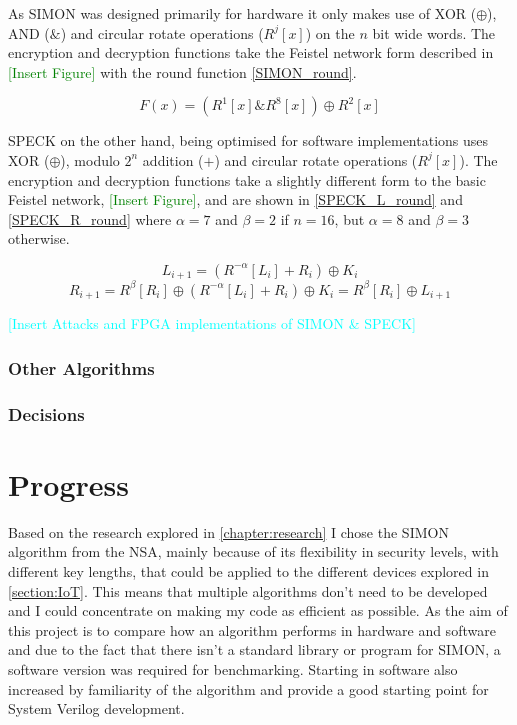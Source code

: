 \documentclass[12pt,twoside,a4paper]{report}
\begin{document}
    As SIMON was designed primarily for hardware it only makes use of XOR ($\oplus$), AND ($\&$) and circular rotate operations ($R^j[x]$) on the $n$ bit wide words.
    The encryption and decryption functions take the Feistel network form described in \textcolor{green}{[Insert Figure]} with the round function \autoref{SIMON_round}.
    
    \begin{equation}
    \label{SIMON_round}
    F(x) = (R^1[x]\&R^8[x]) \oplus R^2[x]
    \end{equation}
    
    SPECK on the other hand, being optimised for software implementations uses XOR ($\oplus$), modulo $2^n$ addition ($+$) and circular rotate operations ($R^j[x]$).
    The encryption and decryption functions take a slightly different form to the basic Feistel network, \textcolor{green}{[Insert Figure]}, and are shown in \autoref{SPECK_L_round} and \ref{SPECK_R_round} where $\alpha = 7$ and $\beta = 2$ if $n = 16$, but $\alpha = 8$ and $\beta = 3$ otherwise.
    
    \begin{equation}
    \label{SPECK_L_round}
    L_{i+1} = (R^{-\alpha}[L_i] + R_i) \oplus K_i
    \end{equation}
    \begin{equation}
    \label{SPECK_R_round}
    R_{i+1} = R^{\beta}[R_i] \oplus (R^{-\alpha}[L_i] + R_i) \oplus K_i = R^{\beta}[R_i] \oplus L_{i+1}
    \end{equation}
    
    \textcolor{cyan}{[Insert Attacks and FPGA implementations of SIMON \& SPECK]}
    
    \subsection{Other Algorithms}
    
    \subsection{Decisions}
    
    \chapter{Progress}
    Based on the research explored in \autoref{chapter:research} I chose the SIMON algorithm from the NSA, mainly because of its flexibility in security levels, with different key lengths, that could be applied to the different devices explored in \autoref{section:IoT}. This means that multiple algorithms don't need to be developed and I could concentrate on making my code as efficient as possible. As the aim of this project is to compare how an algorithm performs in hardware and software and due to the fact that there isn't a standard library or program for SIMON, a software version was required for benchmarking. Starting in software also increased by familiarity of the algorithm and provide a good starting point for System Verilog development.
    
\end{document}
